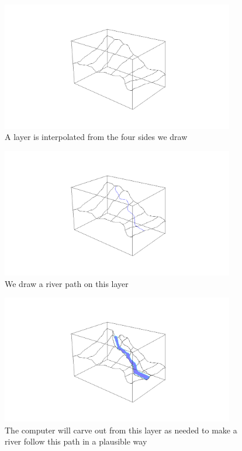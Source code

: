 \documentclass[12pt,a4paper]{article}
\begin{document}
\begin{itemize}
\begin{figure}
\centering
\includegraphics[width=4in]{interpolateLayer}
\caption[]{
  \footnotesize
  A layer is interpolated from the four sides we draw
  \label{fig:interpolateLayer}
}
\end{figure}

\begin{figure}
\centering
\includegraphics[width=4in]{drawRiver}
\caption[]{
  \footnotesize
  We draw a river path on this layer
  \label{fig:drawRiver}
}
\end{figure}

\begin{figure}
\centering
\includegraphics[width=4in]{carveRiver}
\caption[]{
  \footnotesize
  The computer will carve out from this layer as needed to make a river follow this path in a plausible way
  \label{fig:carveRiver}
}
\end{figure}


\end{itemize}
\end{document}
